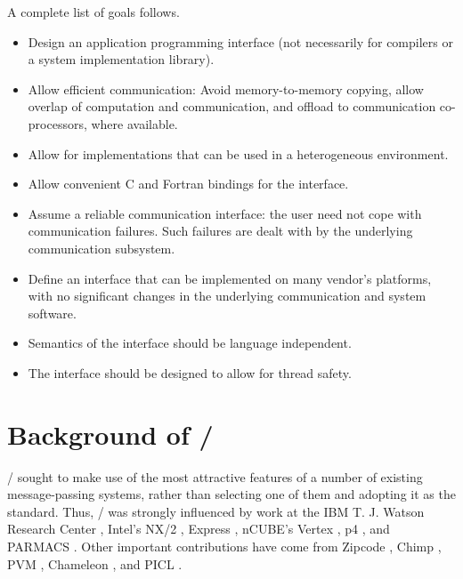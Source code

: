 A complete list of goals follows.

\begin{itemize}

\item
Design an application programming interface (not necessarily for compilers
or a system implementation library).

\item
Allow efficient communication: Avoid memory-to-memory copying,
allow overlap of computation and communication, and offload to communication
co-processors, where available.

\item
Allow for implementations that can be used in a heterogeneous environment.

\item
Allow convenient
C and Fortran
bindings for the interface.

\item
Assume a reliable communication interface:
the user need not cope with communication failures.
Such failures are dealt with by the underlying communication subsystem.

\item
Define an interface that can be implemented on many
vendor's platforms, with no significant changes in the underlying
communication and system software.

\item
Semantics of the interface should be language independent.

\item
The interface should be designed to allow for thread safety.
\end{itemize}


\section{Background of \texorpdfstring{\MPIIDOTO/}{MPI-1.0}}
\label{sec:background:i}

\MPI/ sought to make use of the most attractive features
of a number of existing message-passing systems, rather than selecting one of
them and adopting it as the standard. Thus, \MPI/ was strongly influenced
by work at the IBM T. J. Watson Research Center
\cite{IBM-report1,IBM-report2}, Intel's NX/2 \cite{NX-2}, Express
\cite{express}, nCUBE's Vertex \cite{Vertex},
p4 \cite{p4manual,p4paper}, and
PARMACS \cite{parmacs1,parmacs2}.
Other important contributions have come
from Zipcode \cite{zipcode1,zipcode2}, Chimp \cite{chimp1,chimp2}, PVM
\cite{PVM2,PVM1}, Chameleon \cite{chameleon-user-ref}, and PICL \cite{picl}.


